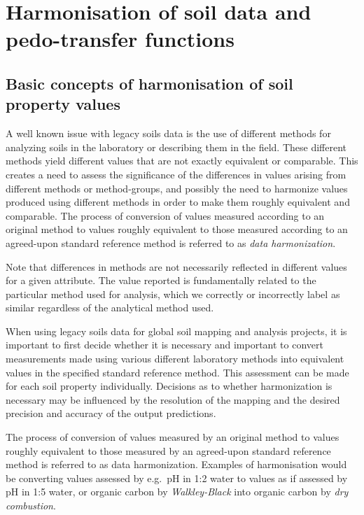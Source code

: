 \documentclass[graybox,natbib,nospthms,UStrade]{svmono}
\begin{document}
\hypertarget{harmonisation-of-soil-data-and-pedo-transfer-functions}{%
\section{Harmonisation of soil data and pedo-transfer functions}\label{harmonisation-of-soil-data-and-pedo-transfer-functions}}

\hypertarget{basic-concepts-of-harmonisation-of-soil-property-values}{%
\subsection{Basic concepts of harmonisation of soil property values}\label{basic-concepts-of-harmonisation-of-soil-property-values}}

A well known issue with legacy soils data is the use of different
methods for analyzing soils in the laboratory or describing them in the
field. These different methods yield different values that are not
exactly equivalent or comparable. This creates a need to assess the
significance of the differences in values arising from different methods
or method-groups, and possibly the need to harmonize values produced
using different methods in order to make them roughly equivalent and
comparable. The process of conversion of values measured according to an
original method to values roughly equivalent to those measured according
to an agreed-upon standard reference method is referred to as \emph{data
harmonization}.

Note that differences in methods are not necessarily reflected in
different values for a given attribute. The value reported is
fundamentally related to the particular method used for analysis, which
we correctly or incorrectly label as similar regardless of the analytical
method used.

When using legacy soils data for global soil mapping and analysis
projects, it is important to first decide whether it is necessary and
important to convert measurements made using various different
laboratory methods into equivalent values in the specified standard
reference method. This assessment can be
made for each soil property individually. Decisions as to whether
harmonization is necessary may be influenced by the resolution of the
mapping and the desired precision and accuracy of the output
predictions.

The process of conversion of values measured by an original method to
values roughly equivalent to those measured by an agreed-upon standard
reference method is referred to as data harmonization. Examples of
harmonisation would be converting values assessed by e.g.~pH in 1:2
water to values as if assessed by pH in 1:5 water, or organic carbon by
\emph{Walkley-Black} into organic carbon by \emph{dry combustion}.
\end{document}
